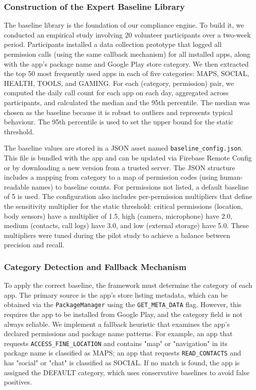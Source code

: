 \subsubsection{Construction of the Expert Baseline Library}

The baseline library is the foundation of our compliance engine. To build it, we conducted an empirical study involving 20 volunteer participants over a two-week period. Participants installed a data collection prototype that logged all permission calls (using the same callback mechanism) for all installed apps, along with the app's package name and Google Play store category. We then extracted the top 50 most frequently used apps in each of five categories: MAPS, SOCIAL, HEALTH, TOOLS, and GAMING. For each (category, permission) pair, we computed the daily call count for each app on each day, aggregated across participants, and calculated the median and the 95th percentile. The median was chosen as the baseline because it is robust to outliers and represents typical behaviour. The 95th percentile is used to set the upper bound for the static threshold.

The baseline values are stored in a JSON asset named \texttt{baseline\_config.json}. This file is bundled with the app and can be updated via Firebase Remote Config or by downloading a new version from a trusted server. The JSON structure includes a mapping from category to a map of permission codes (using human-readable names) to baseline counts. For permissions not listed, a default baseline of 5 is used. The configuration also includes per-permission multipliers that define the sensitivity multiplier for the static threshold: critical permissions (location, body sensors) have a multiplier of 1.5, high (camera, microphone) have 2.0, medium (contacts, call logs) have 3.0, and low (external storage) have 5.0. These multipliers were tuned during the pilot study to achieve a balance between precision and recall.

\subsubsection{Category Detection and Fallback Mechanism}

To apply the correct baseline, the framework must determine the category of each app. The primary source is the app's store listing metadata, which can be obtained via the \texttt{PackageManager} using the \texttt{GET\_META\_DATA} flag. However, this requires the app to be installed from Google Play, and the category field is not always reliable. We implement a fallback heuristic that examines the app's declared permissions and package name patterns. For example, an app that requests \texttt{ACCESS\_FINE\_LOCATION} and contains "map" or "navigation" in its package name is classified as MAPS; an app that requests \texttt{READ\_CONTACTS} and has "social" or "chat" is classified as SOCIAL. If no match is found, the app is assigned the DEFAULT category, which uses conservative baselines to avoid false positives.

